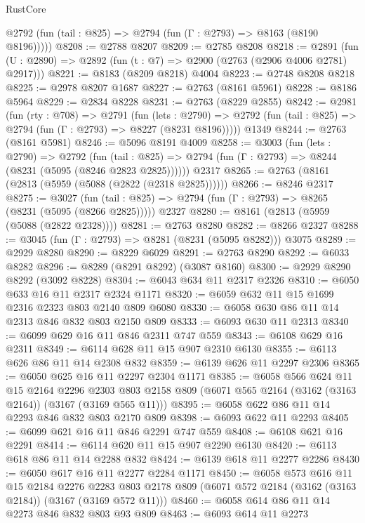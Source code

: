 \begin{lexlean}{RustCore}
\begin{coremodule}
      @2792 (fun (tail : @825) => @2794 (fun (Γ : @2793) => @8163 (@8190 @8196)))))
@8208 := @2788 @8207
@8209 := @2785 @8208
@8218 := @2891 (fun (U : @2890) => @2892 (fun (t : @7) => @2900 (@2763 (@2906 @4006 @2781) @2917)))
@8221 := @8183 (@8209 @8218) @4004
@8223 := @2748 @8208 @8218
@8225 := @2978 @8207 @1687
@8227 := @2763 (@8161 @5961)
@8228 := @8186 @5964
@8229 := @2834 @8228
@8231 := @2763 (@8229 @2855)
@8242 := @2981
    (fun (rty : @708) =>
    @2791
      (fun (lets : @2790) =>
      @2792 (fun (tail : @825) => @2794 (fun (Γ : @2793) => @8227 (@8231 @8196)))))
    @1349
@8244 := @2763 (@8161 @5981)
@8246 := @5096 @8191 @4009
@8258 := @3003
    (fun (lets : @2790) =>
    @2792
      (fun (tail : @825) => @2794 (fun (Γ : @2793) => @8244 (@8231 (@5095 (@8246 @2823 @2825))))))
    @2317
@8265 := @2763 (@8161 (@2813 (@5959 (@5088 (@2822 (@2318 @2825))))))
@8266 := @8246 @2317
@8275 := @3027
    (fun (tail : @825) => @2794 (fun (Γ : @2793) => @8265 (@8231 (@5095 (@8266 @2825)))))
    @2327
@8280 := @8161 (@2813 (@5959 (@5088 (@2822 @2328))))
@8281 := @2763 @8280
@8282 := @8266 @2327
@8288 := @3045 (fun (Γ : @2793) => @8281 (@8231 (@5095 @8282))) @3075
@8289 := @2929 @8280
@8290 := @8229 @6029
@8291 := @2763 @8290
@8292 := @6033 @8282
@8296 := @8289 (@8291 @8292) (@3087 @8160)
@8300 := @2929 @8290 @8292 (@3092 @8228)
@8304 := @6043 @634 @11 @2317 @2326
@8310 := @6050 @633 @16 @11 @2317 @2324 @1171
@8320 := @6059 @632 @11 @15 @1699 @2316 @2323 @803 @2140 @809 @6080
@8330 := @6058 @630 @86 @11 @14 @2313 @846 @832 @803 @2150 @809
@8333 := @6093 @630 @11 @2313
@8340 := @6099 @629 @16 @11 @846 @2311 @747 @559
@8343 := @6108 @629 @16 @2311
@8349 := @6114 @628 @11 @15 @907 @2310 @6130
@8355 := @6113 @626 @86 @11 @14 @2308 @832
@8359 := @6139 @626 @11 @2297 @2306
@8365 := @6050 @625 @16 @11 @2297 @2304 @1171
@8385 := @6058
    @566
    @624
    @11
    @15
    @2164
    @2296
    @2303
    @803
    @2158
    @809
    (@6071 @565 @2164 (@3162 (@3163 @2164)) (@3167 (@3169 @565 @11)))
@8395 := @6058 @622 @86 @11 @14 @2293 @846 @832 @803 @2170 @809
@8398 := @6093 @622 @11 @2293
@8405 := @6099 @621 @16 @11 @846 @2291 @747 @559
@8408 := @6108 @621 @16 @2291
@8414 := @6114 @620 @11 @15 @907 @2290 @6130
@8420 := @6113 @618 @86 @11 @14 @2288 @832
@8424 := @6139 @618 @11 @2277 @2286
@8430 := @6050 @617 @16 @11 @2277 @2284 @1171
@8450 := @6058
    @573
    @616
    @11
    @15
    @2184
    @2276
    @2283
    @803
    @2178
    @809
    (@6071 @572 @2184 (@3162 (@3163 @2184)) (@3167 (@3169 @572 @11)))
@8460 := @6058 @614 @86 @11 @14 @2273 @846 @832 @803 @93 @809
@8463 := @6093 @614 @11 @2273

\end{coremodule}
\end{lexlean}
